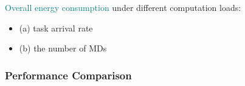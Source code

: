 \begin{frame}
\begin{figure}
	\end{figure}
	
	\textcolor{teal}{Overall energy consumption} under different computation loads:
	\begin{itemize}[]
		
		\item (a) task arrival rate
		
		\item (b) the number of MDs
		
	\end{itemize}
	
\end{frame}


\begin{frame}
	\frametitle{Performance Comparison}
	

\end{frame}
